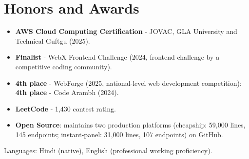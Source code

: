 \documentclass[11pt,a4paper,sans]{moderncv}
\begin{document}

\section{Honors and Awards}
\vspace{1pt}
\begin{itemize}
    \item {\textbf{AWS Cloud Computing Certification} - JOVAC, GLA University and Technical Guftgu (2025).}
    \item {\textbf{Finalist} - WebX Frontend Challenge (2024, frontend challenge by a competitive coding community).}
    \item {\textbf{4th place} - WebForge (2025, national-level web development competition); \textbf{4th place} - Code Arambh (2024).}
    \item {\textbf{LeetCode} - 1,430 contest rating.}
    \item {\textbf{Open Source}: maintains two production platforms (cheapship: 59,000 lines, 145 endpoints; instant-panel: 31,000 lines, 107 endpoints) on GitHub.}
\end{itemize}


\vspace{1pt}
\small{Languages: Hindi (native), English (professional working proficiency).}
\end{document}
